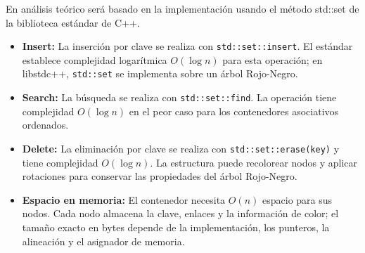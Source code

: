 \documentclass[11pt,letterpaper]{article}
\begin{document}
En análisis teórico será basado en la implementación usando el método std::set de la biblioteca estándar de C++.

\begin{itemize}
    \item \textbf{Insert:} La inserción por clave se realiza con
    \texttt{std::set::insert}. El estándar establece complejidad logarítmica $O(\log n)$
    para esta operación; en libstdc++, \texttt{std::set} se implementa sobre un
    árbol Rojo-Negro.

    \item \textbf{Search:} La búsqueda se realiza con \texttt{std::set::find}.
    La operación tiene complejidad $O(\log n)$ en el peor caso para los contenedores asociativos ordenados.

    \item \textbf{Delete:} La eliminación por clave se realiza con
    \texttt{std::set::erase(key)} y tiene complejidad $O(\log n)$. La estructura puede recolorear nodos y aplicar
    rotaciones para conservar las propiedades del árbol Rojo-Negro.

    \item \textbf{Espacio en memoria:} El contenedor necesita $O(n)$ espacio
    para sus nodos. Cada nodo almacena la clave, enlaces y la información de
    color; el tamaño exacto en bytes depende de la implementación, los
    punteros, la alineación y el asignador de memoria.
\end{itemize}
\end{document}
